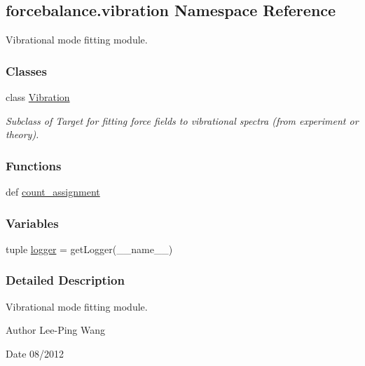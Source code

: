 \hypertarget{namespaceforcebalance_1_1vibration}{\subsection{forcebalance.\-vibration Namespace Reference}
\label{namespaceforcebalance_1_1vibration}
}


Vibrational mode fitting module.  


\subsubsection*{Classes}
\begin{DoxyCompactItemize}
\item 
class \hyperlink{classforcebalance_1_1vibration_1_1Vibration}{Vibration}
\begin{DoxyCompactList}\small\item\em Subclass of Target for fitting force fields to vibrational spectra (from experiment or theory). \end{DoxyCompactList}\end{DoxyCompactItemize}
\subsubsection*{Functions}
\begin{DoxyCompactItemize}
\item 
def \hyperlink{namespaceforcebalance_1_1vibration_aaecc1b522065d7db7c68ca030ab7c449}{count\-\_\-assignment}
\end{DoxyCompactItemize}
\subsubsection*{Variables}
\begin{DoxyCompactItemize}
\item 
tuple \hyperlink{namespaceforcebalance_1_1vibration_a1aaf46e8f2b2c8eedf65477360094c0b}{logger} = get\-Logger(\-\_\-\-\_\-name\-\_\-\-\_\-)
\end{DoxyCompactItemize}


\subsubsection{Detailed Description}
Vibrational mode fitting module. \begin{DoxyAuthor}{Author}
Lee-\/\-Ping Wang 
\end{DoxyAuthor}
\begin{DoxyDate}{Date}
08/2012 
\end{DoxyDate}



